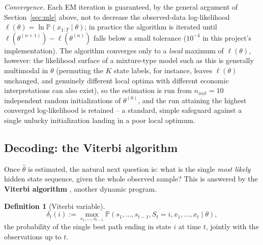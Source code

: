 \documentclass[11pt]{article}
\theoremstyle{definition}
\newtheorem{definition}[theorem]{Definition}
\theoremstyle{remark}
\begin{document}
\emph{Convergence.} Each EM iteration is guaranteed, by the general argument of Section~\ref{sec:mle} above, not to decrease the observed-data log-likelihood $\ell(\theta)=\ln\mathbb{P}(x_{1:T}\mid\theta)$; in practice the algorithm is iterated until $\ell(\theta^{(n+1)})-\ell(\theta^{(n)})$ falls below a small tolerance ($10^{-4}$ in this project's implementation). The algorithm converges only to a \emph{local} maximum of $\ell(\theta)$, however: the likelihood surface of a mixture-type model such as this is generally multimodal in $\theta$ (permuting the $K$ state labels, for instance, leaves $\ell(\theta)$ unchanged, and genuinely different local optima with different economic interpretations can also exist), so the estimation is run from $n_{init}=10$ independent random initializations of $\theta^{(0)}$, and the run attaining the highest converged log-likelihood is retained -- a standard, simple safeguard against a single unlucky initialization landing in a poor local optimum.

\subsection{Decoding: the Viterbi algorithm}
\label{sec:viterbi}

Once $\widehat\theta$ is estimated, the natural next question is: what is the single \emph{most likely} hidden state sequence, given the whole observed sample? This is answered by the \textbf{Viterbi algorithm} \cite{viterbi1967}, another dynamic program.

\begin{definition}[Viterbi variable]
\[
\delta_t(i) := \max_{s_1,\dots,s_{t-1}}\mathbb{P}(s_1,\dots,s_{t-1},S_t=i,x_1,\dots,x_t\mid\theta),
\]
the probability of the single best path ending in state $i$ at time $t$, jointly with the observations up to $t$.
\end{definition}
\end{document}
